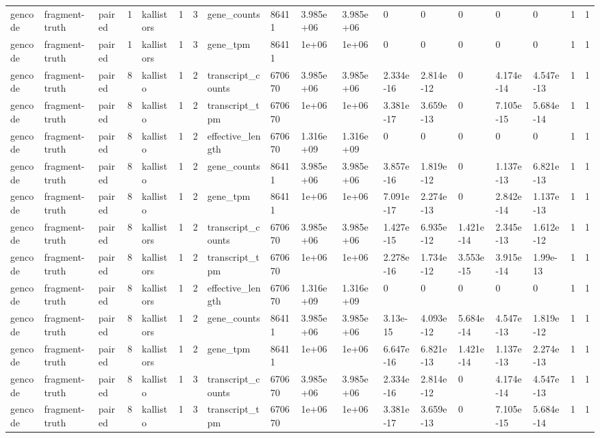 \begin{tabular}{llllllllllllllllll}
gencode & fragment-truth & paired & 1 & kallistors & 1 & 3 & gene\_counts & 86411 & 3.985e+06 & 3.985e+06 & 0 & 0 & 0 & 0 & 0 & 1 & 1 \\
gencode & fragment-truth & paired & 1 & kallistors & 1 & 3 & gene\_tpm & 86411 & 1e+06 & 1e+06 & 0 & 0 & 0 & 0 & 0 & 1 & 1 \\
gencode & fragment-truth & paired & 8 & kallisto & 1 & 2 & transcript\_counts & 670670 & 3.985e+06 & 3.985e+06 & 2.334e-16 & 2.814e-12 & 0 & 4.174e-14 & 4.547e-13 & 1 & 1 \\
gencode & fragment-truth & paired & 8 & kallisto & 1 & 2 & transcript\_tpm & 670670 & 1e+06 & 1e+06 & 3.381e-17 & 3.659e-13 & 0 & 7.105e-15 & 5.684e-14 & 1 & 1 \\
gencode & fragment-truth & paired & 8 & kallisto & 1 & 2 & effective\_length & 670670 & 1.316e+09 & 1.316e+09 & 0 & 0 & 0 & 0 & 0 & 1 & 1 \\
gencode & fragment-truth & paired & 8 & kallisto & 1 & 2 & gene\_counts & 86411 & 3.985e+06 & 3.985e+06 & 3.857e-16 & 1.819e-12 & 0 & 1.137e-13 & 6.821e-13 & 1 & 1 \\
gencode & fragment-truth & paired & 8 & kallisto & 1 & 2 & gene\_tpm & 86411 & 1e+06 & 1e+06 & 7.091e-17 & 2.274e-13 & 0 & 2.842e-14 & 1.137e-13 & 1 & 1 \\
gencode & fragment-truth & paired & 8 & kallistors & 1 & 2 & transcript\_counts & 670670 & 3.985e+06 & 3.985e+06 & 1.427e-15 & 6.935e-12 & 1.421e-14 & 2.345e-13 & 1.612e-12 & 1 & 1 \\
gencode & fragment-truth & paired & 8 & kallistors & 1 & 2 & transcript\_tpm & 670670 & 1e+06 & 1e+06 & 2.278e-16 & 1.734e-12 & 3.553e-15 & 3.915e-14 & 1.99e-13 & 1 & 1 \\
gencode & fragment-truth & paired & 8 & kallistors & 1 & 2 & effective\_length & 670670 & 1.316e+09 & 1.316e+09 & 0 & 0 & 0 & 0 & 0 & 1 & 1 \\
gencode & fragment-truth & paired & 8 & kallistors & 1 & 2 & gene\_counts & 86411 & 3.985e+06 & 3.985e+06 & 3.13e-15 & 4.093e-12 & 5.684e-14 & 4.547e-13 & 1.819e-12 & 1 & 1 \\
gencode & fragment-truth & paired & 8 & kallistors & 1 & 2 & gene\_tpm & 86411 & 1e+06 & 1e+06 & 6.647e-16 & 6.821e-13 & 1.421e-14 & 1.137e-13 & 2.274e-13 & 1 & 1 \\
gencode & fragment-truth & paired & 8 & kallisto & 1 & 3 & transcript\_counts & 670670 & 3.985e+06 & 3.985e+06 & 2.334e-16 & 2.814e-12 & 0 & 4.174e-14 & 4.547e-13 & 1 & 1 \\
gencode & fragment-truth & paired & 8 & kallisto & 1 & 3 & transcript\_tpm & 670670 & 1e+06 & 1e+06 & 3.381e-17 & 3.659e-13 & 0 & 7.105e-15 & 5.684e-14 & 1 & 1 \\

\end{tabular}
